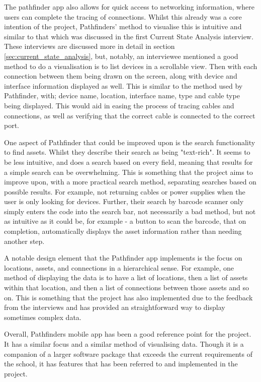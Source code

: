 \documentclass [11pt,a4paper]{article}
\begin{document}
The pathfinder app also allows for quick access to networking information, where users can complete the tracing of connections. Whilst this already was a core intention of the project, Pathfinders' method to visualise this is intuitive and similar to that which was discussed in the first Current State Analysis interview. These interviews are discussed more in detail in section \ref{sec:current_state_analysis}, but, notably, an interviewee mentioned a good method to do a visualisation is to list devices in a scrollable view. Then with each connection between them being drawn on the screen, along with device and interface information displayed as well. This is similar to the method used by Pathfinder, with; device name, location, interface name, type and cable type being displayed. This would aid in easing the process of tracing cables and connections, as well as verifying that the correct cable is connected to the correct port.

One aspect of Pathfinder that could be improved upon is the search functionality to find assets. Whilst they describe their search as being "text-rich". It seems to be less intuitive, and does a search based on every field, meaning that results for a simple search can be overwhelming. This is something that the project aims to improve upon, with a more practical search method, separating searches based on possible results. For example, not returning cables or power supplies when the user is only looking for devices. Further, their search by barcode scanner only simply enters the code into the search bar, not necessarily a bad method, but not as intuitive as it could be, for example - a button to scan the barcode, that on completion, automatically displays the asset information rather than needing another step.

A notable design element that the Pathfinder app implements is the focus on locations, assets, and connections in a hierarchical sense. For example, one method of displaying the data is to have a list of locations, then a list of assets within that location, and then a list of connections between those assets and so on. This is something that the project has also implemented due to the feedback from the interviews and has provided an straightforward way to display sometimes complex data.

Overall, Pathfinders mobile app has been a good reference point for the project. It has a similar focus and a similar method of visualising data. Though it is a companion of a larger software package that exceeds the current requirements of the school, it has features that has been referred to and implemented in the project.  
\end{document}
